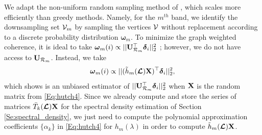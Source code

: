 \documentclass[journal, 10pt]{IEEEtran}
\begin{document}
We adapt the non-uniform random sampling method of \cite{PuyTGV15}, which scales more efficiently than greedy methods. Namely, for the $m^{th}$ band, we identify the downsampling set ${\mathcal{V}}_m$ by sampling the vertices ${\mathcal{V}}$ without replacement according to a discrete probability distribution ${\boldsymbol \omega}_m$. To minimize the graph weighted coherence, it is ideal to take ${\boldsymbol \omega}_m(i) \propto ||{\bf U}_{{\cal R}_m}^{\top} {\boldsymbol \delta}_i ||_2^2$ \cite{PuyTGV15}; however, we do not have access to ${\bf U}_{{\cal R}_m}$. Instead, we take 
\begin{align}\label{Eq:samp_dist}
{\boldsymbol \omega}_m(i) \propto ||(\tilde{h}_m(\L){\bf X})^{\top} {\boldsymbol \delta}_i ||_2^2,
\end{align}
which \cite{PuyTGV15} shows is an unbiased estimator of $||{\bf U}_{{\cal R}_m}^{\top} {\boldsymbol \delta}_i ||_2^2$ when ${\bf X}$ is the random matrix from \eqref{Eq:hutch4}. Since we already compute and store the series of matrices $\bar{T}_k(\boldsymbol{\mathcal{L}}){\bf X}$ for the spectral density estimation of Section \ref{Se:spectral_density}, we just need to compute the polynomial approximation coefficients $\{\alpha_k\}$ in \eqref{Eq:hutch4} for $h_m(\lambda)$ in order to compute $\tilde{h}_m(\boldsymbol{\mathcal{L}}){\bf X}$.


\end{document}
